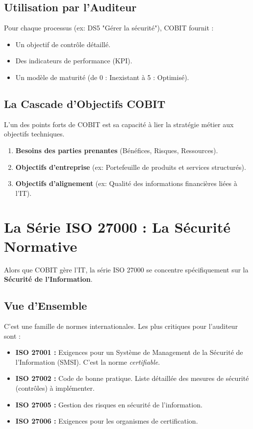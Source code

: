 \subsection{Utilisation par l'Auditeur}

Pour chaque processus (ex: DS5 "Gérer la sécurité"), COBIT fournit :
\begin{itemize}
    \item Un objectif de contrôle détaillé.
    \item Des indicateurs de performance (KPI).
    \item Un modèle de maturité (de 0 : Inexistant à 5 : Optimisé).
\end{itemize}

\subsection{La Cascade d'Objectifs COBIT}
L'un des points forts de COBIT est sa capacité à lier la stratégie métier aux objectifs techniques. 
\begin{enumerate}
    \item \textbf{Besoins des parties prenantes} (Bénéfices, Risques, Ressources).
    \item \textbf{Objectifs d'entreprise} (ex: Portefeuille de produits et services structurés).
    \item \textbf{Objectifs d'alignement} (ex: Qualité des informations financières liées à l'IT).
\end{enumerate}
\section{La Série ISO 27000 : La Sécurité Normative}

Alors que COBIT gère l'IT, la série ISO 27000 se concentre spécifiquement sur la \textbf{Sécurité de l'Information}.

\subsection{Vue d'Ensemble}

C'est une famille de normes internationales. Les plus critiques pour l'auditeur sont :

\begin{itemize}
    \item \textbf{ISO 27001 :} Exigences pour un Système de Management de la Sécurité de l'Information (SMSI). C'est la norme \textit{certifiable}.
    \item \textbf{ISO 27002 :} Code de bonne pratique. Liste détaillée des mesures de sécurité (contrôles) à implémenter.
    \item \textbf{ISO 27005 :} Gestion des risques en sécurité de l'information.
    \item \textbf{ISO 27006 :} Exigences pour les organismes de certification.
\end{itemize}

